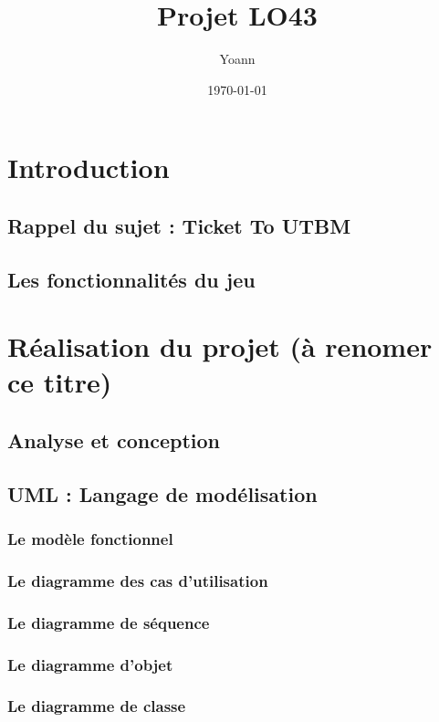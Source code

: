 \documentclass{report}
\title{Projet LO43}
\author{Yoann \bsc{Caplain}}
\date{\today}
\begin{document}
\maketitle \clearpage
\tableofcontents %

\chapter{Introduction}
\section{Rappel du sujet : Ticket To UTBM}
\section{Les fonctionnalités du jeu}

\chapter{Réalisation du projet (à renomer ce titre)}
\section{Analyse et conception}
\section{UML : Langage de modélisation}
\subsection{Le modèle fonctionnel}
\subsection{Le diagramme des cas d'utilisation}
\subsection{Le diagramme de séquence}
\subsection{Le diagramme d'objet}
\subsection{Le diagramme de classe}
\end{document}
